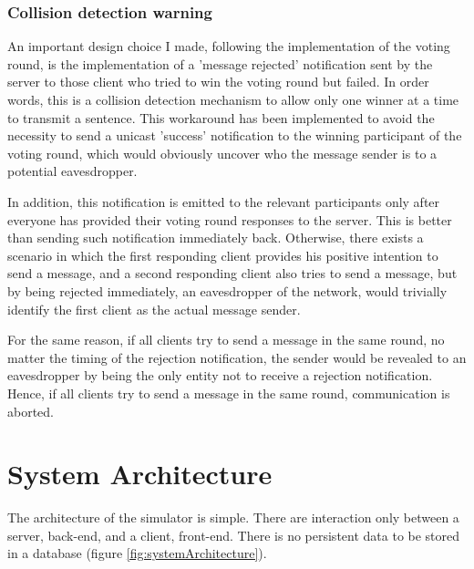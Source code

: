 \subsubsection{Collision detection warning} \label{sec:collisionDetectionWarnings}
An important design choice I made, following the implementation of the voting round, is the implementation of a 'message rejected' notification sent by the server to those client who tried to win the voting round but failed. In order words, this is a collision detection mechanism to allow only one winner at a time to transmit a sentence. This workaround has been implemented to avoid the necessity to send a unicast 'success' notification to the winning participant of the voting round, which would obviously uncover who the message sender is to a potential eavesdropper.

In addition, this notification is emitted to the relevant participants only after everyone has provided their voting round responses to the server. This is better than sending such notification immediately back. Otherwise, there exists a scenario in which the first responding client provides his positive intention to send a message, and a second responding client also tries to send a message, but by being rejected immediately, an eavesdropper of the network, would trivially identify the first client as the actual message sender.

For the same reason, if all clients try to send a message in the same round, no matter the timing of the rejection notification,  the sender would be revealed to an eavesdropper by being the only entity not to receive a rejection notification. Hence, if all clients try to send a message in the same round, communication is aborted.


\section{System Architecture}
The architecture of the simulator is simple. There are interaction only between a server, back-end, and a client, front-end. There is no persistent data to be stored in a database (figure \ref{fig:systemArchitecture}).

